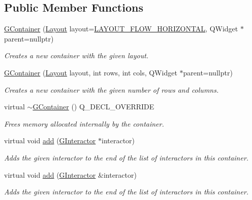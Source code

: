 \subsection*{Public Member Functions}
\begin{DoxyCompactItemize}
\item 
\mbox{\hyperlink{classGContainer_a09fc5a49b2ea0bc895fbf2772c311325}{G\+Container}} (\mbox{\hyperlink{classGContainer_a1b7da28ed84c0763e8f92cde2df4799b}{Layout}} layout=\mbox{\hyperlink{classGContainer_a1b7da28ed84c0763e8f92cde2df4799bac89a811e02b929a18f7f34e7d3bebd63}{L\+A\+Y\+O\+U\+T\+\_\+\+F\+L\+O\+W\+\_\+\+H\+O\+R\+I\+Z\+O\+N\+T\+AL}}, Q\+Widget $\ast$parent=nullptr)
\begin{DoxyCompactList}\small\item\em Creates a new container with the given layout. \end{DoxyCompactList}\item 
\mbox{\hyperlink{classGContainer_a042cb94e18801664efa748e8a8fa74c1}{G\+Container}} (\mbox{\hyperlink{classGContainer_a1b7da28ed84c0763e8f92cde2df4799b}{Layout}} layout, int rows, int cols, Q\+Widget $\ast$parent=nullptr)
\begin{DoxyCompactList}\small\item\em Creates a new container with the given number of rows and columns. \end{DoxyCompactList}\item 
virtual \mbox{\hyperlink{classGContainer_a0a3b11ccad0281e55a509da7e1d94543}{$\sim$\+G\+Container}} () Q\+\_\+\+D\+E\+C\+L\+\_\+\+O\+V\+E\+R\+R\+I\+DE
\begin{DoxyCompactList}\small\item\em Frees memory allocated internally by the container. \end{DoxyCompactList}\item 
virtual void \mbox{\hyperlink{classGContainer_a6f99b7c841256dbdc5acaafbbca4e685}{add}} (\mbox{\hyperlink{classGInteractor}{G\+Interactor}} $\ast$interactor)
\begin{DoxyCompactList}\small\item\em Adds the given interactor to the end of the list of interactors in this container. \end{DoxyCompactList}\item 
virtual void \mbox{\hyperlink{classGContainer_a33b08fe5428ed634a658deab076099f7}{add}} (\mbox{\hyperlink{classGInteractor}{G\+Interactor}} \&interactor)
\begin{DoxyCompactList}\small\item\em Adds the given interactor to the end of the list of interactors in this container. \end{DoxyCompactList}\item 

\end{DoxyCompactItemize}

